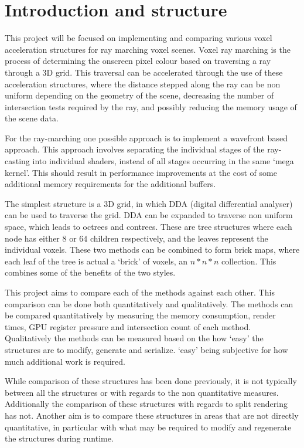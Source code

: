 \section*{Introduction and structure}

This project will be focused on implementing and comparing various
voxel acceleration structures for ray marching voxel scenes. Voxel
ray marching is the process of determining the onscreen pixel colour based
on traversing a ray through a 3D grid. This traversal can be accelerated through
the use of these acceleration structures, where the distance stepped along the
ray can be non uniform depending on the geometry of the scene,
decreasing the number of intersection tests required by the ray,
and possibly reducing the memory usage of the scene data.

For the ray-marching one possible approach is to implement a
wavefront\cite{laine2013wavefront} based approach. This approach
involves separating the individual stages of the ray-casting into individual
shaders, instead of all stages occurring in the same `mega kernel'. This should
result in performance improvements at the cost of some additional
memory requirements for the additional buffers.

The simplest structure is a 3D grid, in which DDA (digital
differential analyser)\cite{amanatides1987fast} can be used to
traverse the grid. DDA can be expanded to traverse non uniform space,
which leads to octrees\cite{laine2010svo} and contrees. These are
tree structures where each node has either $8$ or $64$ children
respectively, and the leaves represent the individual voxels. These
two methods can be combined to form brick
maps\cite{van2015brickmap}, where each leaf of the tree is actual
a `brick' of voxels, an $n*n*n$ collection. This combines some of the
benefits of the two styles.

This project aims to compare each of the methods against each other.
This comparison can be done both quantitatively and qualitatively.
The methods can be compared quantitatively by measuring the
memory consumption, render times, GPU register pressure and
intersection count of each method.
Qualitatively the methods can be measured based on the how `easy' the
structures are to modify, generate and serialize. `easy' being subjective
for how much additional work is required.

While comparison of these structures has been done previously, it is
not typically between all the structures or with regards to the non
quantitative measures. Additionally the comparison
of these structures with regards to split rendering has not. Another aim is to
compare these structures in areas that are not directly quantitative,
in particular with what may be required to modify and regenerate the structures
during runtime.

